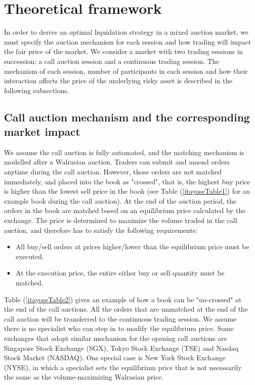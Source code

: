 \documentclass{article}
\begin{document}
\section{Theoretical framework}\label{auctionDesign}
In order to derive an optimal liquidation strategy in a mixed auction market, we must specify the auction mechanism for each session and how trading will impact the fair price of the market. We consider a market with two trading sessions in succession: a call auction session and a continuous trading session. The mechanism of each session, number of participants in each session and how their interaction affects the price of the underlying risky asset is described in the following subsections.
\subsection{Call auction mechanism and the corresponding market impact}
We assume the call auction is fully automated, and the matching mechanism is modelled after a Walrasian auction. Traders can submit and amend orders anytime during the call auction. However, those orders are not matched immediately, and placed into the book as "crossed", that is, the highest buy price is higher than the lowest sell price in the book (see Table (\ref{itayoseTable1}) for an example book during the call auction). At the end of the auction period, the orders in the book are matched based on an equilibrium price calculated by the exchange. The price is determined to maximize the volume traded in the call auction, and therefore has to satisfy the following requirements:
\begin{itemize}
\item All buy/sell orders at prices higher/lower than the equilibrium price must be executed.
\item At the execution price, the entire either buy or sell quantity must be matched.
\end{itemize}
Table (\ref{itayoseTable2}) gives an example of how a book can be "un-crossed" at the end of the call auctions. All the orders that are unmatched at the end of the call auction will be transferred to the continuous trading session. We assume there is no specialist who can step in to modify the equilibrium price. Some exchanges that adopt similar mechanism for the opening call auctions are Singapore Stock Exchange (SGX), Tokyo Stock Exchange (TSE) and Nasdaq Stock Market (NASDAQ). One special case is New York Stock Exchange (NYSE), in which a specialist sets the equilibrium price that is not necessarily the same as the volume-maximizing Walrasian price. 
\end{document}
